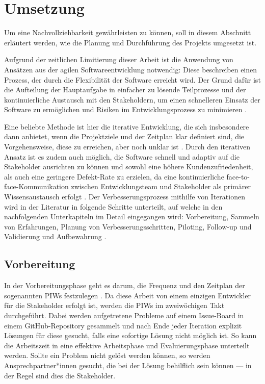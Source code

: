 \section{Umsetzung}
\label{sec:umsetzung}
Um eine Nachvollziehbarkeit gewährleisten zu können, soll in diesem Abschnitt erläutert werden, wie die Planung und Durchführung des Projekts umgesetzt ist.

Aufgrund der zeitlichen Limitierung dieser Arbeit ist die Anwendung von Ansätzen aus der agilen Softwareentwicklung notwendig: Diese beschreiben einen Prozess, der durch die Flexibilität der Software erreicht wird. Der Grund dafür ist die Aufteilung der Hauptaufgabe in einfacher zu lösende Teilprozesse und der kontinuierliche Austausch mit den Stakeholdern, um einen schnelleren Einsatz der Software zu ermöglichen und Risiken im Entwicklungsprozess zu minimieren \cite{Siepermann2018}. 

Eine beliebte Methode ist hier die iterative Entwicklung, die sich insbesondere dann anbietet, wenn die Projektziele und der Zeitplan klar definiert sind, die Vorgehensweise, diese zu erreichen, aber noch unklar ist \cite{salo2007iterative}. Durch den iterativen Ansatz ist es zudem auch möglich, die Software schnell und adaptiv auf die Stakeholder ausrichten zu können und sowohl eine höhere Kundenzufriedenheit, als auch eine geringere Defekt-Rate zu erzielen, da eine kontinuierliche face-to-face-Kommunikation zwischen Entwicklungsteam und Stakeholder als primärer Wissensaustausch erfolgt \cite{salo2007iterative}. Der Verbesserungsprozess mithilfe von Iterationen wird in der Literatur in folgende Schritte unterteilt, auf welche in den nachfolgenden Unterkapiteln im Detail eingegangen wird: Vorbereitung, Sammeln von Erfahrungen, Planung von Verbesserungsschritten, Piloting, Follow-up und Validierung und Aufbewahrung \cite{salo2007iterative}.

\subsection{Vorbereitung}
In der Vorbereitungsphase geht es darum, die Frequenz und den Zeitplan der sogenannten \ac{PIW}s festzulegen \cite{salo2007iterative}. Da diese Arbeit von einem einzigen Entwickler für die Stakeholder erfolgt ist, werden die PIWs im zweiwöchigen Takt durchgeführt. Dabei werden aufgetretene Probleme auf einem Issue-Board in einem GitHub-Repository gesammelt und nach Ende jeder Iteration explizit Lösungen für diese gesucht, falls eine sofortige Lösung nicht möglich ist. So kann die Arbeitszeit in eine effektive Arbeitsphase und Evaluierungsphase unterteilt werden. Sollte ein Problem nicht gelöst werden können, so werden Ansprechpartner*innen gesucht, die bei der Lösung behilflich sein können --- in der Regel sind dies die Stakeholder.

